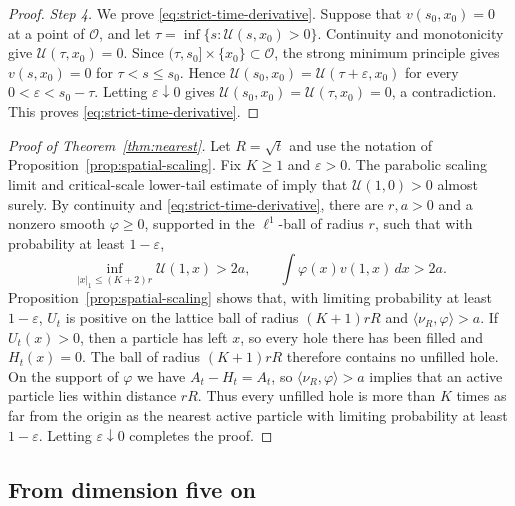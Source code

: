 \documentclass[11pt]{amsart}
\theoremstyle{plain}
\theoremstyle{definition}
\newcommand{\eps}{\varepsilon}
\begin{document}
\begin{proof}
	\smallskip
	\noindent\emph{Step 4.} We prove \eqref{eq:strict-time-derivative}.
	Suppose that $v(s_0,x_0)=0$ at a point of $\mathcal O$, and let
	$\tau=\inf\{s:\mathcal U(s,x_0)>0\}$. Continuity and monotonicity give
	$\mathcal U(\tau,x_0)=0$. Since
	$(\tau,s_0]\times\{x_0\}\subset\mathcal O$, the strong minimum principle
	gives $v(s,x_0)=0$ for $\tau<s\leq s_0$. Hence $\mathcal U(s_0,x_0)=
	\mathcal U(\tau+\varepsilon,x_0)$ for every
	$0<\varepsilon<s_0-\tau$. Letting
	$\varepsilon\downarrow0$ gives $\mathcal U(s_0,x_0)=
	\mathcal U(\tau,x_0)=0$, a contradiction. This proves
	\eqref{eq:strict-time-derivative}.
\end{proof}

\begin{proof}[Proof of Theorem~\ref{thm:nearest}]
	Let $R=\sqrt t$ and use the notation of
	Proposition~\ref{prop:spatial-scaling}. Fix $K\geq1$ and $\eps>0$.
	The parabolic scaling limit and critical-scale lower-tail estimate of
	\citet{BP} imply that $\mathcal U(1,0)>0$ almost surely. By continuity and
	\eqref{eq:strict-time-derivative}, there are $r,a>0$ and a nonzero smooth
	$\varphi\geq0$, supported in the $\ell^1$-ball of radius $r$, such that with
	probability at least $1-\eps$,
	\[
		\inf_{|x|_1\leq(K+2)r}\mathcal U(1,x)>2a,
		\qquad \int\varphi(x)v(1,x)\,dx>2a.
	\]
	Proposition~\ref{prop:spatial-scaling} shows that, with limiting probability
	at least $1-\eps$, $U_t$ is positive on the lattice ball of radius
	$(K+1)rR$ and $\langle\nu_R,\varphi\rangle>a$.
	If $U_t(x)>0$, then a particle has left $x$,
	so every hole there has been filled and $H_t(x)=0$. The ball of
	radius $(K+1)rR$
	therefore contains no unfilled hole. On the support of $\varphi$ we have
	$A_t-H_t=A_t$, so
	$\langle\nu_R,\varphi\rangle>a$ implies that an active particle lies within
	distance $rR$. Thus
	every unfilled hole is more than $K$ times as far from the
	origin as the nearest active particle with limiting probability at least
	$1-\eps$. Letting
	$\eps\downarrow0$ completes the proof.
\end{proof}

\subsection{From dimension five on}
\end{document}
